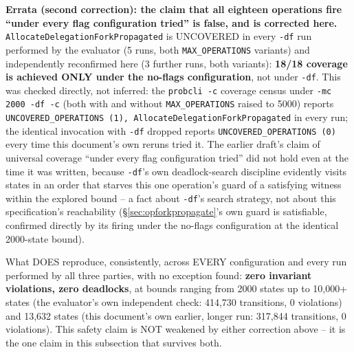 \documentclass[a4paper,10pt,fleqn]{article}
\newcommand{\field}[1]{\texttt{#1}}
\begin{document}
\textbf{Errata (second correction): the claim that all eighteen
operations fire ``under every flag configuration tried'' is false, and
is corrected here.} \field{AllocateDelegationForkPropagated} is
UNCOVERED in every \texttt{-df} run performed by the evaluator (5 runs,
both \field{MAX\_OPERATIONS} variants) and independently reconfirmed
here (3 further runs, both variants): \textbf{18/18 coverage is
achieved ONLY under the no-flags configuration}, not under
\texttt{-df}. This was checked directly, not inferred: the
\texttt{probcli -c} coverage census under \texttt{-mc 2000 -df -c}
(both with and without \field{MAX\_OPERATIONS} raised to 5000) reports
\texttt{UNCOVERED\_OPERATIONS (1), AllocateDelegationForkPropagated} in
every run; the identical invocation with \texttt{-df} dropped reports
\texttt{UNCOVERED\_OPERATIONS (0)} every time this document's own
reruns tried it. The earlier draft's claim of universal coverage
``under every flag configuration tried'' did not hold even at the time
it was written, because \texttt{-df}'s own deadlock-search discipline
evidently visits states in an order that starves this one operation's
guard of a satisfying witness within the explored bound -- a fact about
\texttt{-df}'s search strategy, not about this specification's
reachability (\S\ref{sec:opforkpropagate}'s own guard is satisfiable,
confirmed directly by its firing under the no-flags configuration at
the identical 2000-state bound).

What DOES reproduce, consistently, across EVERY configuration and every
run performed by all three parties, with no exception found: \textbf{zero
invariant violations, zero deadlocks}, at bounds ranging from 2000
states up to 10,000+ states (the evaluator's own independent check:
414,730 transitions, 0 violations) and 13,632 states (this document's
own earlier, longer run: 317,844 transitions, 0 violations). This
safety claim is NOT weakened by either correction above -- it is the
one claim in this subsection that survives both.
\end{document}
